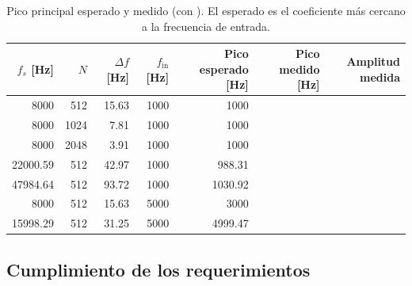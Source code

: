\documentclass[11pt,a4paper]{article}
\begin{document}
\begin{table}[H]
\centering
\caption{Pico principal esperado y medido (con ).
El esperado es el coeficiente más cercano a la frecuencia de entrada.}
\label{tab:medido}
\footnotesize
\begin{tabular}{@{}r r r r r r r@{}}
\toprule
\textbf{$f_s$ [Hz]} & \textbf{$N$} & \textbf{$\Delta f$ [Hz]} &
\textbf{$f_{\text{in}}$ [Hz]} & \textbf{Pico esperado [Hz]} &
\textbf{Pico medido [Hz]} & \textbf{Amplitud medida}\\
\midrule
\num{8000}     & 512  & \num{15.63} & \num{1000} & \num{1000}    & \completar{} & \completar{}\\
\num{8000}     & 1024 & \num{7.81}  & \num{1000} & \num{1000}    & \completar{} & \completar{}\\
\num{8000}     & 2048 & \num{3.91}  & \num{1000} & \num{1000}    & \completar{} & \completar{}\\
\num{22000.59} & 512  & \num{42.97} & \num{1000} & \num{988.31}  & \completar{} & \completar{}\\
\num{47984.64} & 512  & \num{93.72} & \num{1000} & \num{1030.92} & \completar{} & \completar{}\\
\num{8000}     & 512  & \num{15.63} & \num{5000} & \num{3000}    & \completar{} & \completar{}\\
\num{15998.29} & 512  & \num{31.25} & \num{5000} & \num{4999.47} & \completar{} & \completar{}\\
\bottomrule
\end{tabular}
\end{table}

\subsection{Cumplimiento de los requerimientos}
\end{document}
